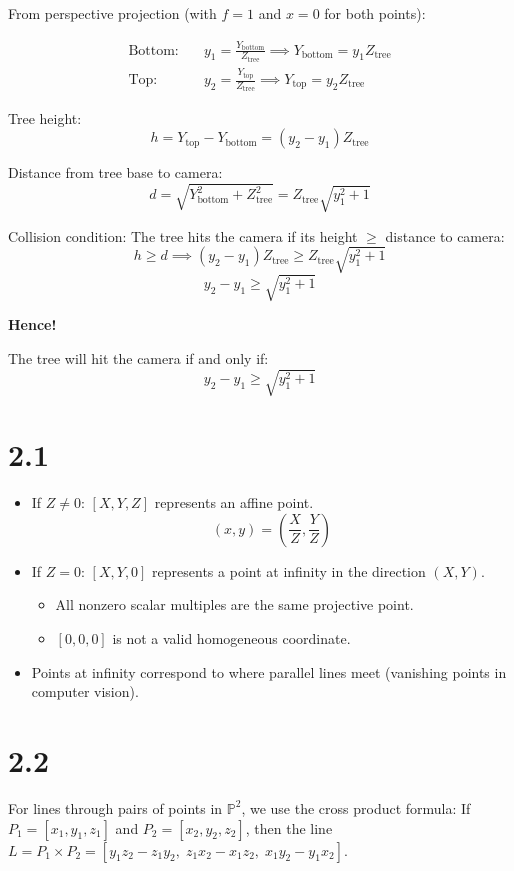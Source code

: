 \documentclass[12pt]{article}
\begin{document}

From perspective projection (with $f = 1$ and $x = 0$ for both points):

\begin{align*}
    \text{Bottom:} \quad & y_1 = \frac{Y_\text{bottom}}{Z_\text{tree}} \implies Y_\text{bottom} = y_1 Z_\text{tree} \\
    \text{Top:} \quad & y_2 = \frac{Y_\text{top}}{Z_\text{tree}} \implies Y_\text{top} = y_2 Z_\text{tree}
\end{align*}

Tree height:
\[
h = Y_\text{top} - Y_\text{bottom} = (y_2 - y_1) Z_\text{tree}
\]

Distance from tree base to camera:
\[
d = \sqrt{Y_\text{bottom}^2 + Z_\text{tree}^2} = Z_\text{tree} \sqrt{y_1^2 + 1}
\]

Collision condition: The tree hits the camera if its height $\geq$ distance to camera:
\[
h \geq d \implies (y_2 - y_1) Z_\text{tree} \geq Z_\text{tree} \sqrt{y_1^2 + 1}
\]
\[
y_2 - y_1 \geq \sqrt{y_1^2 + 1}
\]

\textbf{Hence!}

The tree will hit the camera if and only if:
\[
y_2 - y_1 \geq \sqrt{y_1^2 + 1}
\]

\section*{2.1}

\begin{itemize}
    \item If $Z \neq 0$: $[X, Y, Z]$ represents an affine point.
    \[
    (x, y) = \left( \frac{X}{Z}, \frac{Y}{Z} \right)
    \]
    \item If $Z = 0$: $[X, Y, 0]$ represents a point at infinity in the direction $(X, Y)$.
    \begin{itemize}
        \item All nonzero scalar multiples are the same projective point.
        \item $[0, 0, 0]$ is not a valid homogeneous coordinate.
    \end{itemize}
    \item Points at infinity correspond to where parallel lines meet (vanishing points in computer vision).
\end{itemize}

\section*{2.2}
For lines through pairs of points in $\mathbb{P}^2$, we use the cross product formula: If $P_1 = [x_1, y_1, z_1]$ and $P_2 = [x_2, y_2, z_2]$, then the line $L = P_1 \times P_2 = [y_1z_2 - z_1y_2,\; z_1x_2 - x_1z_2,\; x_1y_2 - y_1x_2]$.
\end{document}

